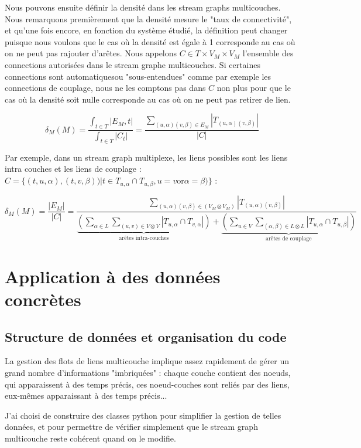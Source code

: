 \documentclass[11pt,a4paper]{article}
\theoremstyle{definition}
\theoremstyle{remark}
\theoremstyle{remark}
\begin{document}
	Nous pouvons ensuite définir la densité dans les stream graphs multicouches. Nous remarquons premièrement que la densité mesure le "taux de connectivité", et qu'une fois encore, en fonction du système étudié, la définition peut changer puisque nous voulons que le cas où la densité est égale à 1 corresponde au cas où on ne peut pas rajouter d'arêtes. Nous appelons  $C \in T \times V_M\times V_M$ l'ensemble des connections autorisées dans le stream graphe multicouches. Si certaines connections sont \og automatiques\fg ou "sous-entendues" comme par exemple les connections de couplage, nous ne les comptons pas dans $C$ non plus pour que le cas où la densité soit nulle corresponde au cas où on ne peut pas retirer de lien.


	\[
		\delta_M (M) 
		= \frac{\int_{t\in T}|E_M,t|}{\int_{t\in T}|C_t|} 
		= \frac{\sum_{(u,\alpha)(v,\beta) \in E_M}|T_{(u,\alpha)(v,\beta)}|}{|C|}
	\]

	Par exemple, dans un stream graph multiplexe, les liens possibles sont les liens intra couches et les liens de couplage : $C=\{(t,u,\alpha),(t,v,\beta))| t\in T_{u,\alpha} \cap T_{u,\beta}, u=v \text{or} \alpha = \beta)\}$ :

	\[
		\delta_M (M) = 
		\frac{|E_M|}{|C|}= 
		\frac{\sum_{(u,\alpha)(v,\beta) \in (V_M \otimes V_M)} |T_{(u,\alpha)(v,\beta)}|}
		{\underbrace{(\sum_{\alpha \in L}\sum_{(u,v) \in V\otimes V}|T_{u,\alpha} \cap T_{v,\alpha}|)}_{\text{arêtes intra-couches}}+\underbrace{( \sum_{u \in V } \sum_{(\alpha,\beta) \in L \otimes L}|T_{u,\alpha}\cap T_{u,\beta}|)}_{\text{arêtes de couplage}}}
	\]

	
\section{Application à des données concrètes}

\subsection{Structure de données et organisation du code} 
\label{descode}

	La gestion des flots de liens multicouche implique assez rapidement de gérer un grand nombre d'informations "imbriquées" : chaque couche contient des noeuds, qui apparaissent à des temps précis, ces noeud-couches sont reliés par des liens, eux-mêmes apparaissant à des temps précis...
	
	J'ai choisi de construire des classes python pour simplifier la gestion de telles données, et pour permettre de vérifier simplement que le stream graph multicouche reste cohérent quand on le modifie.
	
\end{document}
